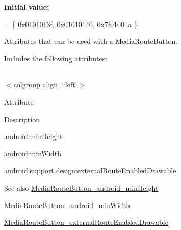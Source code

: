{\bfseries Initial value\+:}
\begin{DoxyCode}
= \{
            0x0101013f, 0x01010140, 0x7f01001a
        \}
\end{DoxyCode}
Attributes that can be used with a Media\+Route\+Button. 

Includes the following attributes\+:

\tabulinesep=1mm
\begin{longtabu} spread 0pt [c]{*{0}{|X[-1]}|}
\hline
\end{longtabu}
$<$colgroup align=\char`\"{}left\char`\"{}$>$ 

Attribute

Description 

{\ttfamily \hyperlink{classandroid_1_1support_1_1design_1_1R_1_1styleable_af2cd6575ac0673a2c4446a9f381b1fd5}{android\+:min\+Height}}

{\ttfamily \hyperlink{classandroid_1_1support_1_1design_1_1R_1_1styleable_a5b08a856a9c3ae5fb84f939c813f264a}{android\+:min\+Width}}

{\ttfamily \hyperlink{classandroid_1_1support_1_1design_1_1R_1_1styleable_a89e09d0e97da9ba4c2c7a8e24b9b4090}{android.\+support.\+design\+:external\+Route\+Enabled\+Drawable}}

\begin{DoxySeeAlso}{See also}
\hyperlink{classandroid_1_1support_1_1design_1_1R_1_1styleable_af2cd6575ac0673a2c4446a9f381b1fd5}{Media\+Route\+Button\+\_\+android\+\_\+min\+Height} 

\hyperlink{classandroid_1_1support_1_1design_1_1R_1_1styleable_a5b08a856a9c3ae5fb84f939c813f264a}{Media\+Route\+Button\+\_\+android\+\_\+min\+Width} 

\hyperlink{classandroid_1_1support_1_1design_1_1R_1_1styleable_a89e09d0e97da9ba4c2c7a8e24b9b4090}{Media\+Route\+Button\+\_\+external\+Route\+Enabled\+Drawable} 
\end{DoxySeeAlso}
\mbox{\label{classandroid_1_1support_1_1design_1_1R_1_1styleable_af2cd6575ac0673a2c4446a9f381b1fd5}} 
